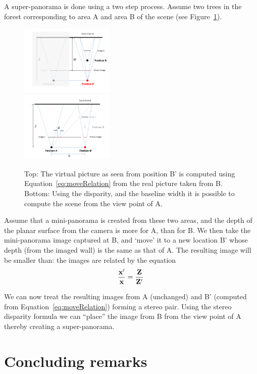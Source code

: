 \documentclass[10pt,twocolumn,letterpaper]{article}
\begin{document}
A super-panorama is done using a two step process. Assume two trees in
the forest corresponding to area A and area B of the scene (see
Figure~\ref{fig:stereo}). 
\begin{figure}[h!]
  \centering
  \includegraphics[width=0.4\textwidth]{figures/move} \\
  \includegraphics[width=0.4\textwidth]{figures/stereo} 
  \caption{ \label{fig:stereo} Top: The virtual picture as seen from position B'
    is computed using Equation~\ref{eq:moveRelation} from the real picture
    taken from B.  Bottom: Using the disparity, and the baseline width
  it is possible to compute the scene from the view point of A.}
\end{figure}    
Assume that a mini-panorama is created from these two areas, and the
depth of the planar surface from the camera is more for A, than for
B. We then take the mini-panorama image captured at B, and `move' it to
a new location B’ whose depth (from the imaged wall) is the same as
that of A. The resulting image  will be smaller than: the images are
related by the equation
\begin{equation}
  \label{eq:moveRelation}
  {\bf \frac{x'}{x} = \frac{Z}{Z'}}
\end{equation}

We can now treat the resulting images from A (unchanged) and B’
(computed from Equation~\ref{eq:moveRelation}) forming a stereo pair.
Using the stereo disparity formula we can ``place'' the image from B from the
view point of A thereby creating a super-panorama.



\section{Concluding remarks}
\end{document}
